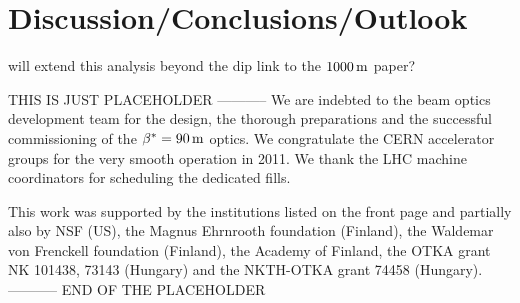 \documentclass[twocolumn,a4paper,superscriptaddress,preprintnumbers,showpacs,nofootinbib]{revtex4-1}
\def\un#1{\,{\rm #1}}
\def\hang{\hangindent=\parindent}
\def\>{\par\vskip\itskip\parindent\itindent\indent\hang\llap{\hbox to3mm{$\bullet$\hss}}}
\def\>E{\par\vskip\itskip\parindent\itindent\indent\hang\llap{\hbox to3mm{\hss}}}
\def\>>{\par\vskip\iitskip\parindent\iitindent\indent\hang\llap{\hbox to\iitindent{\hss--\ }}}
\begin{document}
\section{Discussion/Conclusions/Outlook}

\> will extend this analysis beyond the dip
\> link to the $1000\un{m}$ paper?



\acknowledgements
THIS IS JUST PLACEHOLDER -----------
We are indebted to the beam optics development team
for the design, the thorough preparations and the successful commissioning of the $\beta^* = 90\un{m}$ optics. We congratulate the CERN accelerator groups for the very smooth operation in 2011. We thank
the LHC machine coordinators for scheduling the dedicated fills.

This work was supported by the institutions listed on the front page and partially also by NSF (US), the Magnus
Ehrnrooth foundation (Finland), the Waldemar von Frenckell foundation (Finland), the Academy of
Finland, the OTKA grant NK 101438, 73143 (Hungary) and the NKTH-OTKA grant 74458 (Hungary).
----------- END OF THE PLACEHOLDER
\end{document}
